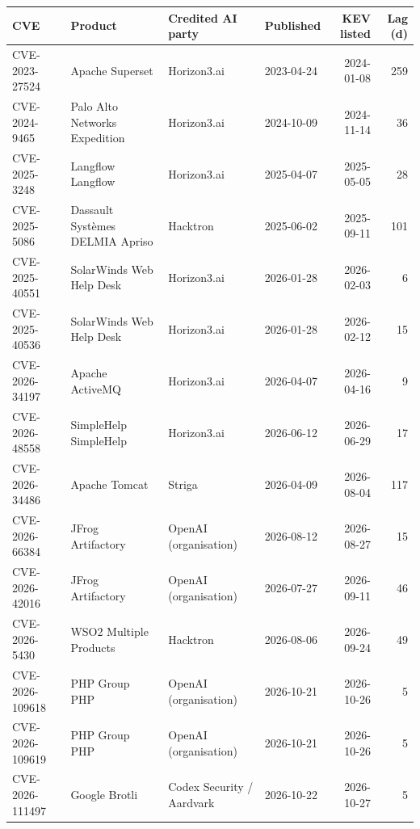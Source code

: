\begin{tabular}{llllrr}
\toprule
CVE & Product & Credited AI party & Published & KEV listed & Lag (d) \\
\midrule
CVE-2023-27524 & Apache Superset & Horizon3.ai & 2023-04-24 & 2024-01-08 & 259 \\
CVE-2024-9465 & Palo Alto Networks Expedition & Horizon3.ai & 2024-10-09 & 2024-11-14 & 36 \\
CVE-2025-3248 & Langflow Langflow & Horizon3.ai & 2025-04-07 & 2025-05-05 & 28 \\
CVE-2025-5086 & Dassault Systèmes DELMIA Apriso & Hacktron & 2025-06-02 & 2025-09-11 & 101 \\
CVE-2025-40551 & SolarWinds Web Help Desk & Horizon3.ai & 2026-01-28 & 2026-02-03 & 6 \\
CVE-2025-40536 & SolarWinds Web Help Desk & Horizon3.ai & 2026-01-28 & 2026-02-12 & 15 \\
CVE-2026-34197 & Apache ActiveMQ & Horizon3.ai & 2026-04-07 & 2026-04-16 & 9 \\
CVE-2026-48558 & SimpleHelp  SimpleHelp & Horizon3.ai & 2026-06-12 & 2026-06-29 & 17 \\
CVE-2026-34486 & Apache Tomcat & Striga & 2026-04-09 & 2026-08-04 & 117 \\
CVE-2026-66384 & JFrog Artifactory & OpenAI (organisation) & 2026-08-12 & 2026-08-27 & 15 \\
CVE-2026-42016 & JFrog Artifactory & OpenAI (organisation) & 2026-07-27 & 2026-09-11 & 46 \\
CVE-2026-5430 & WSO2 Multiple Products & Hacktron & 2026-08-06 & 2026-09-24 & 49 \\
CVE-2026-109618 & PHP Group PHP & OpenAI (organisation) & 2026-10-21 & 2026-10-26 & 5 \\
CVE-2026-109619 & PHP Group PHP & OpenAI (organisation) & 2026-10-21 & 2026-10-26 & 5 \\
CVE-2026-111497 & Google Brotli & Codex Security / Aardvark & 2026-10-22 & 2026-10-27 & 5 \\
\bottomrule
\end{tabular}